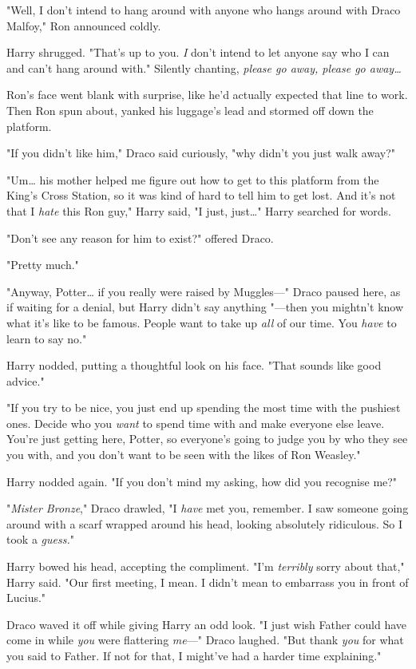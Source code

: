 "Well, I don't intend to hang around with anyone who hangs around with Draco 
Malfoy," Ron announced coldly.

Harry shrugged. "That's up to you. \emph{I} don't intend to let anyone say who 
I can and can't hang around with." Silently chanting, \emph{please go away, 
please go away{\ldots}}

Ron's face went blank with surprise, like he'd actually expected that line to 
work. Then Ron spun about, yanked his luggage's lead and stormed off down the 
platform.

"If you didn't like him," Draco said curiously, "why didn't you just walk away?"

"Um{\ldots} his mother helped me figure out how to get to this platform from 
the King's Cross Station, so it was kind of hard to tell him to get lost. And 
it's not that I \emph{hate} this Ron guy," Harry said, "I just, just{\ldots}" 
Harry searched for words.

"Don't see any reason for him to exist?" offered Draco.

"Pretty much."

"Anyway, Potter{\ldots} if you really were raised by Muggles---" Draco paused 
here, as if waiting for a denial, but Harry didn't say anything "---then you 
mightn't know what it's like to be famous. People want to take up \emph{all} of 
our time. You \emph{have} to learn to say no."

Harry nodded, putting a thoughtful look on his face. "That sounds like good 
advice."

"If you try to be nice, you just end up spending the most time with the 
pushiest ones. Decide who you \emph{want} to spend time with and make everyone 
else leave. You're just getting here, Potter, so everyone's going to judge you 
by who they see you with, and you don't want to be seen with the likes of Ron 
Weasley."

Harry nodded again. "If you don't mind my asking, how did you recognise me?"

"\emph{Mister Bronze}," Draco drawled, "I \emph{have} met you, remember. I saw 
someone going around with a scarf wrapped around his head, looking absolutely 
ridiculous. So I took a \emph{guess.}"

Harry bowed his head, accepting the compliment. "I'm \emph{terribly} sorry 
about that," Harry said. "Our first meeting, I mean. I didn't mean to embarrass 
you in front of Lucius."

Draco waved it off while giving Harry an odd look. "I just wish Father could 
have come in while \emph{you} were flattering \emph{me}---" Draco laughed. "But 
thank \emph{you} for what you said to Father. If not for that, I might've had a 
harder time explaining."


